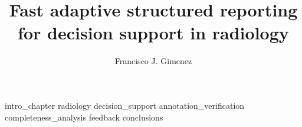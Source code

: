 \documentclass[12pt,twoside]{report}		%
\title{Fast adaptive structured reporting for decision support in radiology}
\author{Francisco J. Gimenez}
\begin{document}
\beforepreface						%



\ifproposal 						%
\else 
	 
\fi	


{ \hypersetup{hidelinks}			%
  \contentstablesfigures }			%
\startmaindoc						%


{intro_chapter}
{radiology}
{decision_support}
{annotation_verification}
{completeness_analysis}
{feedback}
{conclusions}




%

\end{document}
